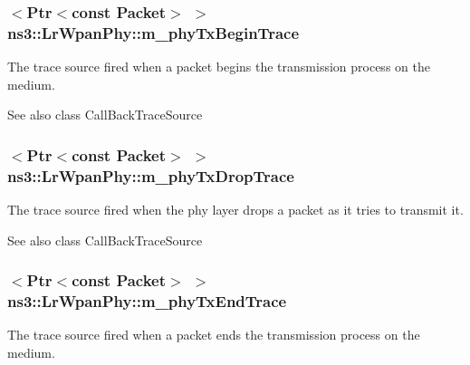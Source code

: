 \subsubsection[{\texorpdfstring{m\+\_\+phy\+Tx\+Begin\+Trace}{m_phyTxBeginTrace}}]{$<${\bf Ptr}$<$const {\bf Packet}$>$ $>$ ns3\+::\+Lr\+Wpan\+Phy\+::m\+\_\+phy\+Tx\+Begin\+Trace\hspace{0.3cm}{\ttfamily [private]}}\hypertarget{classns3_1_1LrWpanPhy_a72273155da1a3b5340389633f5486860}{}\label{classns3_1_1LrWpanPhy_a72273155da1a3b5340389633f5486860}
The trace source fired when a packet begins the transmission process on the medium.

\begin{DoxySeeAlso}{See also}
class Call\+Back\+Trace\+Source 
\end{DoxySeeAlso}
\subsubsection[{\texorpdfstring{m\+\_\+phy\+Tx\+Drop\+Trace}{m_phyTxDropTrace}}]{$<${\bf Ptr}$<$const {\bf Packet}$>$ $>$ ns3\+::\+Lr\+Wpan\+Phy\+::m\+\_\+phy\+Tx\+Drop\+Trace\hspace{0.3cm}{\ttfamily [private]}}\hypertarget{classns3_1_1LrWpanPhy_ac8651acbf8f744b8442c05a490a35720}{}\label{classns3_1_1LrWpanPhy_ac8651acbf8f744b8442c05a490a35720}
The trace source fired when the phy layer drops a packet as it tries to transmit it.

\begin{DoxySeeAlso}{See also}
class Call\+Back\+Trace\+Source 
\end{DoxySeeAlso}
\subsubsection[{\texorpdfstring{m\+\_\+phy\+Tx\+End\+Trace}{m_phyTxEndTrace}}]{$<${\bf Ptr}$<$const {\bf Packet}$>$ $>$ ns3\+::\+Lr\+Wpan\+Phy\+::m\+\_\+phy\+Tx\+End\+Trace\hspace{0.3cm}{\ttfamily [private]}}\hypertarget{classns3_1_1LrWpanPhy_a34c1c896916f90010cd7f4ba5eaa5385}{}\label{classns3_1_1LrWpanPhy_a34c1c896916f90010cd7f4ba5eaa5385}
The trace source fired when a packet ends the transmission process on the medium.

